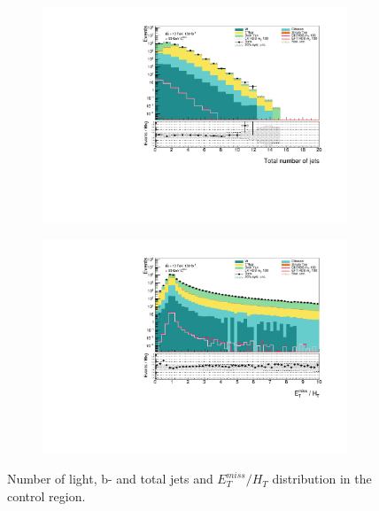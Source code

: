 \documentclass[12pt, a4paper]{book}
\begin{document}
\begin{figure}[!ht]
\begin{subfigure}[b]{0.49\textwidth}
        \centering
        \includegraphics[width=\textwidth]{nTJet.pdf}
    \end{subfigure}
    \hfill
    \begin{subfigure}[b]{0.49\textwidth}
        \centering
        \includegraphics[width=\textwidth]{rt.pdf}
    \end{subfigure}
    \caption{Number of light, b- and total jets and $E_T^{miss}/H_T$ distribution in the control region.}
\end{figure}

\clearpage
\end{document}
